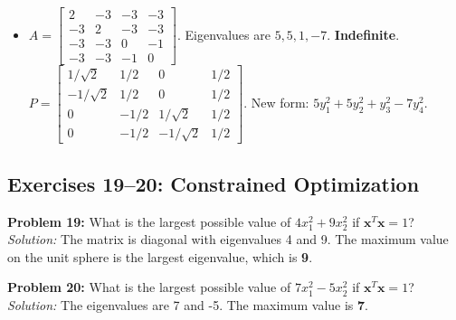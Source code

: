 \documentclass[11pt, letterpaper]{article}
\theoremstyle{definition}
\theoremstyle{remark}
\newcommand{\x}{\mathbf{x}}
\begin{document}
\begin{itemize}
    \item[\textbf{18.}] $A = \begin{bmatrix} 2 & -3 & -3 & -3 \\ -3 & 2 & -3 & -3 \\ -3 & -3 & 0 & -1 \\ -3 & -3 & -1 & 0 \end{bmatrix}$. Eigenvalues are $5, 5, 1, -7$. \textbf{Indefinite}. \\
    $P = \begin{bmatrix} 1/\sqrt{2} & 1/2 & 0 & 1/2 \\ -1/\sqrt{2} & 1/2 & 0 & 1/2 \\ 0 & -1/2 & 1/\sqrt{2} & 1/2 \\ 0 & -1/2 & -1/\sqrt{2} & 1/2 \end{bmatrix}$. New form: $5y_1^2 + 5y_2^2 + y_3^2 - 7y_4^2$.
\end{itemize}

\subsection{Exercises 19--20: Constrained Optimization}

\textbf{Problem 19:} What is the largest possible value of $4x_1^2 + 9x_2^2$ if $\x^T \x = 1$? \\
\textit{Solution:} The matrix is diagonal with eigenvalues 4 and 9. The maximum value on the unit sphere is the largest eigenvalue, which is \textbf{9}.

\textbf{Problem 20:} What is the largest possible value of $7x_1^2 - 5x_2^2$ if $\x^T \x = 1$? \\
\textit{Solution:} The eigenvalues are 7 and -5. The maximum value is \textbf{7}.
\end{document}
